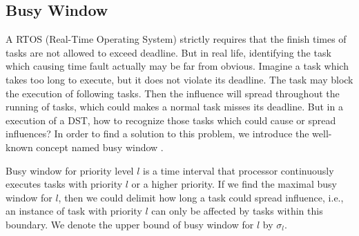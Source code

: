 \documentclass[sigconf]{acmart}
\begin{document}

\subsection{Busy Window}\label{section_busywindow}

A RTOS (Real-Time Operating System) strictly requires that the finish times of tasks are not allowed to exceed deadline. But in real life, identifying the task which causing time fault actually may be far from obvious. Imagine a task which takes too long to execute, but it does not violate its deadline. The task may block the execution of following tasks. Then the influence will spread throughout the running of tasks, which could makes a normal task misses its deadline. But in a execution of a DST, how to recognize those tasks which could cause or spread influences? 
In order to find a solution to this problem, we introduce the well-known concept named busy window \cite{DBLP:conf/rtss/Lehoczky90}. 

Busy window for priority level $l$ is a time interval that processor continuously executes tasks with priority $l$ or a higher priority. If we find the maximal busy window for $l$, then we could delimit how long a task could spread influence, i.e., an instance of task with priority $l$ can only be affected by tasks within this boundary. We denote the upper bound of busy window for $l$ by $\sigma_l$. %
\end{document}
